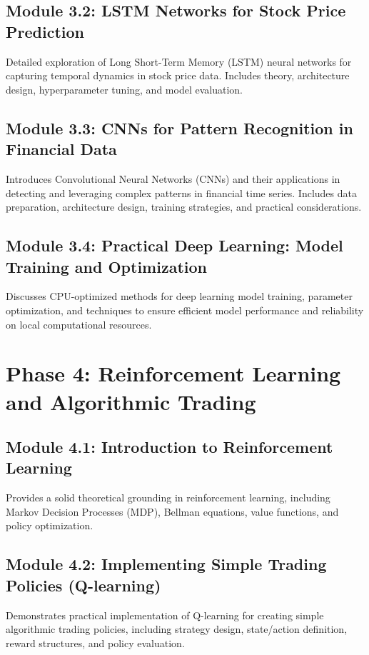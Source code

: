 \documentclass{article}
\begin{document}
\subsection{Module 3.2: LSTM Networks for Stock Price Prediction}
Detailed exploration of Long Short-Term Memory (LSTM) neural networks for capturing temporal dynamics in stock price data. Includes theory, architecture design, hyperparameter tuning, and model evaluation.

\subsection{Module 3.3: CNNs for Pattern Recognition in Financial Data}
Introduces Convolutional Neural Networks (CNNs) and their applications in detecting and leveraging complex patterns in financial time series. Includes data preparation, architecture design, training strategies, and practical considerations.

\subsection{Module 3.4: Practical Deep Learning: Model Training and Optimization}
Discusses CPU-optimized methods for deep learning model training, parameter optimization, and techniques to ensure efficient model performance and reliability on local computational resources.

\section{Phase 4: Reinforcement Learning and Algorithmic Trading}

\subsection{Module 4.1: Introduction to Reinforcement Learning}
Provides a solid theoretical grounding in reinforcement learning, including Markov Decision Processes (MDP), Bellman equations, value functions, and policy optimization.

\subsection{Module 4.2: Implementing Simple Trading Policies (Q-learning)}
Demonstrates practical implementation of Q-learning for creating simple algorithmic trading policies, including strategy design, state/action definition, reward structures, and policy evaluation.
\end{document}
